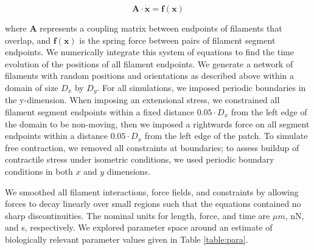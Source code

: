 \begin{equation}
\mathbf{A \cdot \dot x} = \mathbf{f(x)}
\end{equation}

where $\mathbf{A }$ represents a coupling matrix between endpoints of filaments that overlap, and $\mathbf{f(x)}$ is the spring force between pairs of filament segment endpoints.   We numerically integrate this system of equations to find the time evolution of the positions of all filament endpoints. We generate a network of filaments with random positions and orientations as described above within a domain of size $D_x$ by $D_y$.  For all simulations, we imposed periodic boundaries in the y-dimension. When imposing an extensional stress, we constrained all filament segment endpoints within a fixed distance $0.05\cdot D_x$ from the left edge of the domain to be non-moving, then we imposed a rightwards force on all segment endpoints within a distance $0.05\cdot D_x$ from the left edge of the patch.   To simulate free contraction, we removed all constraints at boundaries; to assess buildup of contractile stress under isometric conditions, we used periodic boundary conditions in both $x$ and $y$ dimensions.




We smoothed all filament interactions, force fields, and constraints by allowing forces to decay linearly over small regions such that the equations contained no sharp discontinuities. The nominal units for length, force, and time are $\mu m$, nN, and s, respectively.  We explored parameter space around an estimate of biologically relevant parameter values given in Table \ref{table:para}. 


